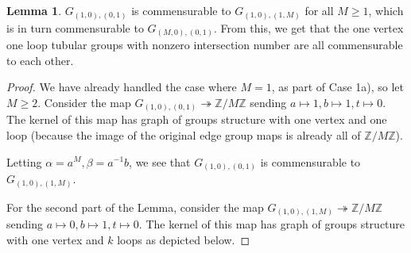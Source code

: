 \documentclass[10pt]{article}
\def\integers{{\mathbb{Z}}}
\theoremstyle{definition}
\newtheorem{lemma}{Lemma}
\begin{document}
\begin{lemma}
    $G_{(1,0),(0,1)}$ is commensurable to $G_{(1,0),(1,M)}$ for all $M\geq 1$, which is in turn commensurable to $G_{(M,0),(0,1)}$. From this, we get that  the one vertex one loop tubular groups with nonzero intersection number are all commensurable to each other. 
\end{lemma}

\begin{proof} 
We have already handled the case where $M=1$, as part of Case 1a), so let $M\geq 2$. Consider the map $G_{(1,0),(0,1)} \twoheadrightarrow \integers/M\integers$ sending $a \mapsto 1, b \mapsto 1, t \mapsto 0$. The kernel of this map has graph of groups structure with one vertex and one loop (because the image of the original edge group maps is already all of $\integers/M\integers$). 

\begin{center}
 \end{center}

 Letting $\alpha=a^M, \beta=a^{-1}b$, we see that $G_{(1,0),(0,1)}$ is commensurable to $G_{(1,0),(1,M)}$. 


For the second part of the Lemma, consider the map $G_{(1,0),(1,M)} \twoheadrightarrow \integers/M \integers$ sending $a \mapsto 0, b \mapsto 1, t \mapsto 0$. The kernel of this map has graph of groups structure with one vertex and $k$ loops as depicted below. 

\end{proof}
\end{document}
